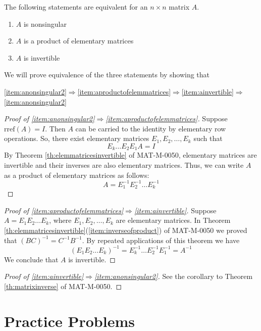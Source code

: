 \documentclass{ximera}
\begin{document}
\begin{theorem}\label{th:elemmatrices}
The following statements are equivalent for an $n\times n$ matrix $A$.
\begin{enumerate}
\item\label{item:anonsingular2} $A$ is nonsingular
\item\label{item:aproductofelemmatrices} $A$ is a product of elementary matrices
\item\label{item:ainvertible} $A$ is invertible
\end{enumerate}
\end{theorem}
We will prove equivalence of the three statements by showing that
\begin{center}
\ref{item:anonsingular2}$\Rightarrow$\ref{item:aproductofelemmatrices}$\Rightarrow$\ref{item:ainvertible}$\Rightarrow$\ref{item:anonsingular2}
\end{center}
\begin{proof}[Proof of \ref{item:anonsingular2}$\Rightarrow$\ref{item:aproductofelemmatrices}]
Suppose $\mbox{rref}(A)=I$.  Then $A$ can be carried to the identity by elementary row operations.  So, there exist elementary matrices $E_1, E_2, \ldots ,E_k$ such that 
$$E_k\ldots E_2E_1A=I$$
By Theorem \ref{th:elemmatricesinvertible} of MAT-M-0050, elementary matrices are invertible and their inverses are also elementary matrices.  Thus, we can write $A$ as a product of elementary matrices as follows:
$$A=E_1^{-1}E_2^{-1}\ldots E_k^{-1}$$
\end{proof}
\begin{proof}[Proof of \ref{item:aproductofelemmatrices}$\Rightarrow$\ref{item:ainvertible}]
Suppose $A=E_1E_2\ldots E_k$, where $E_1, E_2, \ldots , E_k$ are elementary matrices.  In Theorem \ref{th:elemmatricesinvertible}(\ref{item:inverseofproduct}) of MAT-M-0050 we proved that $(BC)^{-1} = C^{-1} B^{-1}$.  By repeated applications of this theorem we have
$$(E_1E_2\ldots E_k)^{-1}=E_k^{-1}\ldots E_2^{-1}E_1^{-1}=A^{-1}$$
We conclude that $A$ is invertible.
\end{proof}
\begin{proof}[Proof of \ref{item:ainvertible}$\Rightarrow$\ref{item:anonsingular2}]
See the corollary to Theorem \ref{th:matrixinverse} of MAT-M-0050.
\end{proof}




\section*{Practice Problems}
\end{document}
